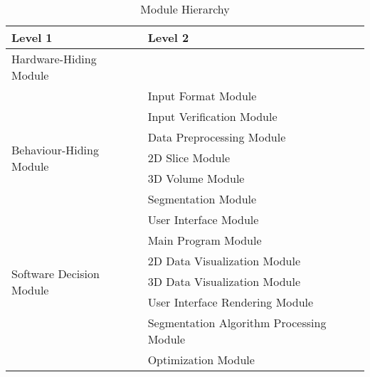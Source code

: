 \documentclass[12pt, titlepage]{article}
\begin{document}
\begin{table}[h!]
  \centering
  \begin{tabular}{p{} p{}}
    \toprule
    \textbf{Level 1}                                      & \textbf{Level 2}                         \\
    \midrule

    {Hardware-Hiding Module}                              & ~                                        \\
    \midrule

    \multirow{7}{0.3\textwidth}{Behaviour-Hiding Module}  & Input Format Module                      \\
                                                          & Input Verification Module                \\
                                                          & Data Preprocessing Module                \\
                                                          & 2D Slice Module                          \\
                                                          & 3D Volume Module                         \\
                                                          & Segmentation Module                      \\
                                                          & User Interface Module                    \\
                                                          & Main Program Module                      \\

    \midrule

    \multirow{3}{0.3\textwidth}{Software Decision Module} & 2D Data Visualization Module             \\
                                                          & 3D Data Visualization Module             \\
                                                          & User Interface Rendering Module          \\
                                                          & Segmentation Algorithm Processing Module \\
                                                          & Optimization Module                      \\
    \bottomrule
  \end{tabular}
  \caption{Module Hierarchy}
  \label{TblMH}
\end{table}
\end{document}
